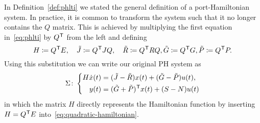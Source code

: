 \begin{remark}
    In Definition~\ref{def:phlti} we stated the general definition of a port-Hamiltonian system.
    In practice, it is common to transform the system such that it no longer contains the $Q$ matrix.
    This is achieved by multiplying the first equation in~\eqref{eq:phlti} by $Q^{\mkern1mu \mathsf{T}}$ from the left and defining
    \begin{equation*}
        H \coloneqq Q^{\mkern1mu \mathsf{T}} E,\quad \tilde{J} \coloneqq Q^{\mkern1mu \mathsf{T}} J Q,\quad \tilde{R} \coloneqq Q^{\mkern1mu \mathsf{T}} R Q, \tilde{G} \coloneqq Q^{\mkern1mu \mathsf{T}} G, \tilde{P} \coloneqq Q^{\mkern1mu \mathsf{T}} P.
    \end{equation*}
    Using this substitution we can write our original \ac{PH} system as
    \begin{equation*}
        \Sigma \colon \left\lbrace
        \begin{aligned}
            H \dot{x}(t) &= (\tilde{J} - \tilde{R}) x(t) + (\tilde{G} - \tilde{P}) u(t), \\
            y(t) &= (\tilde{G} + \tilde{P})^{\mkern1mu \mathsf{T}} x(t) + (S - N) u(t)
        \end{aligned}
        \right.
    \end{equation*}
    in which the matrix $H$ directly represents the Hamiltonian function by inserting $H = Q^{\mkern1mu \mathsf{T}} E$ into~\eqref{eq:quadratic-hamiltonian}.
\end{remark}

